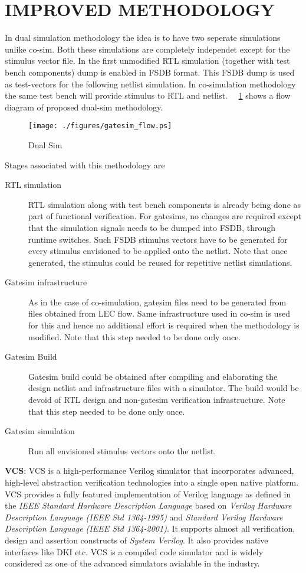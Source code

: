 \section {IMPROVED METHODOLOGY}
\label{sec:dualsim:im}
In dual simulation methodology the idea is to have two seperate simulations unlike co-sim. Both these simulations are completely independet except for the stimulus vector file. In the first unmodified RTL simulation (together with test bench components) dump is enabled in FSDB format. This FSDB dump is used as test-vectors for the following netlist simulation. In co-simulation methodology the same test bench will provide stimulus to RTL and netlist. ~\figurename{~\ref{fig:gatesim_flow.ps}} shows a flow diagram of proposed dual-sim methodology.  
\begin{figure}[h]
\centering
\texttt{[image: ./figures/gatesim\_flow.ps]}
\caption{Dual Sim}
\label{fig:gatesim_flow.ps}
\end{figure}

Stages associated with this methodology are
\begin{description}
	\item[RTL simulation] RTL simulation along with test bench components is already being done as part of functional verification. For gatesims, no changes are required except that the simulation signals needs to be dumped into FSDB, through runtime switches. Such FSDB stimulus vectors have to be generated for every stimulus envisioned to be applied onto the netlist. Note that once generated, the stimulus could be reused for repetitive netlist simulations.
	\item[Gatesim infrastructure] As in the case of co-simulation, gatesim files need to be generated from files obtained from LEC flow. Same infrastructure used in co-sim is used for this and hence no additional effort is required when the methodology is modified. Note that this step needed to be done only once.
	\item[Gatesim Build] Gatesim build could be obtained after compiling and elaborating the design netlist and infrastructure files with a simulator. The build would be devoid of RTL design and non-gatesim verification infrastructure. Note that this step needed to be done only once.
	\item[Gatesim simulation] Run all envisioned stimulus vectors onto the netlist.
\end{description}


{\bf VCS}: VCS is a high-performance Verilog simulator that  incorporates advanced, high-level abstraction verification  technologies into a single open native platform. VCS provides a fully featured implementation of Verilog language as defined in the {\it IEEE Standard Hardware Description Language} based on {\it Verilog Hardware Description Language (IEEE Std 1364-1995)} and {\it Standard Verilog Hardware Description Language (IEEE Std 1364-2001)}. It supports almost all verification, design and assertion constructs of {\it System Verilog}. It also provides native interfaces like DKI etc. VCS is a compiled code simulator and is widely considered as one of the advanced simulators avialable in the industry.

